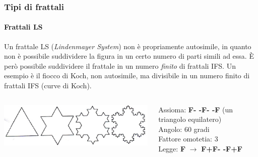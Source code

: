 \documentclass{beamer}
\begin{document}
		\begin{frame}
			\frametitle{Tipi di frattali}
			\framesubtitle{Frattali LS}
			Un frattale LS (\textit{Lindenmayer System}) non è propriamente autosimile, in quanto non è possibile suddividere la figura in un certo numero di parti simili ad essa. \`E però possibile suddividere il frattale in un numero \emph{finito} di frattali IFS. Un esempio è il fiocco di Koch, non autosimile, ma divisibile in un numero finito di frattali IFS (curve di Koch).
			\bigskip
			\begin{columns}
				\begin{column}{0.5\textwidth}
					\begin{center}
						\includegraphics[width=0.8\linewidth]{"../Fiocco di Koch/fiocco"}
					\end{center}
				\end{column}
				\begin{column}{0.5\textwidth}
					\begin{tiny}
						 Assioma: \textbf{F- -F- -F} (un triangolo equilatero)\\
						 Angolo: $60$ gradi \\
						 Fattore omotetia: $3$\\  
						 Legge: \textbf{F} $\to$ \textbf {F+F- -F+F}
					\end{tiny}
				\end{column}
			\end{columns}
		\end{frame}
\end{document}
